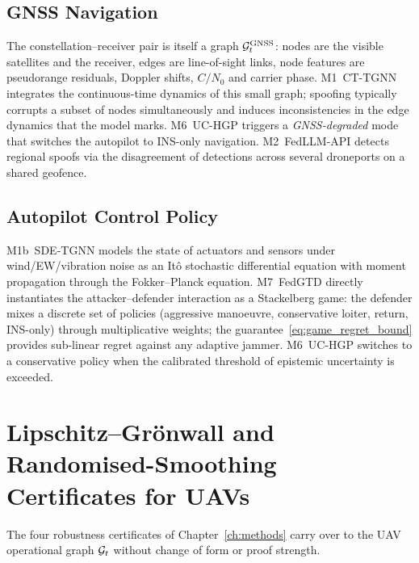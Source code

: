 \subsection{GNSS Navigation}
\label{sec:uav_gnss}

The constellation--receiver pair is itself a graph
$\mathcal{G}_t^{\text{GNSS}}$: nodes are the visible satellites and the
receiver, edges are line-of-sight links, node features are
pseudorange residuals, Doppler shifts, $C/N_0$ and carrier phase.
\textsf{M1~CT-TGNN} integrates the continuous-time dynamics of this
small graph; spoofing typically corrupts a subset of nodes
simultaneously and induces inconsistencies in the edge dynamics that
the model marks. \textsf{M6~UC-HGP} triggers a \emph{GNSS-degraded}
mode that switches the autopilot to INS-only navigation.
\textsf{M2~FedLLM-API} detects regional spoofs via the disagreement
of detections across several droneports on a shared geofence.

\subsection{Autopilot Control Policy}
\label{sec:uav_autopilot}

\textsf{M1b~SDE-TGNN} models the state of actuators and sensors
under wind/EW/vibration noise as an Itô stochastic differential
equation with moment propagation through the Fokker--Planck equation.
\textsf{M7~FedGTD} directly instantiates the
attacker--defender interaction as a Stackelberg game: the defender
mixes a discrete set of policies (aggressive manoeuvre, conservative
loiter, return, INS-only) through multiplicative weights; the
guarantee~\eqref{eq:game_regret_bound} provides sub-linear regret
against any adaptive jammer. \textsf{M6~UC-HGP} switches to a
conservative policy when the calibrated threshold of epistemic
uncertainty is exceeded.


\section{Lipschitz--Grönwall and Randomised-Smoothing Certificates for UAVs}
\label{sec:uav_certs}

The four robustness certificates of Chapter~\ref{ch:methods} carry
over to the UAV operational graph $\mathcal{G}_t$ without change of form or
proof strength.

